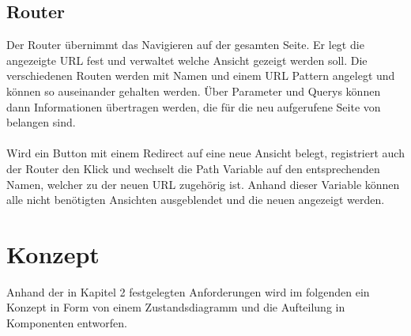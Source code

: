\documentclass[12pt,					%
							 oneside,			%
							 a4paper,			%
							 halfparskip,		%
							 liststotoc,			%
							 bibtotoc,			%
							 fleqn,				%
							 pointlessnumbers]	%
							 {scrreprt}
\begin{document}
		\section{Router}
	Der Router übernimmt das Navigieren auf der gesamten Seite. Er legt die angezeigte URL fest und verwaltet welche Ansicht gezeigt werden soll. Die verschiedenen Routen werden mit Namen und einem URL Pattern angelegt und können so auseinander gehalten werden. Über Parameter und Querys können dann Informationen übertragen werden, die für die neu aufgerufene Seite von belangen sind.\\
\\
Wird ein Button mit einem Redirect auf eine neue Ansicht belegt, registriert auch der Router den Klick und wechselt die Path Variable auf den entsprechenden Namen, welcher zu der neuen URL zugehörig ist. Anhand dieser Variable können alle nicht benötigten Ansichten ausgeblendet und die neuen angezeigt werden.				

\chapter{Konzept}	
Anhand der in Kapitel 2 festgelegten Anforderungen	wird im folgenden ein Konzept in Form von einem Zustandsdiagramm und die Aufteilung in Komponenten entworfen.

		
\end{document}
